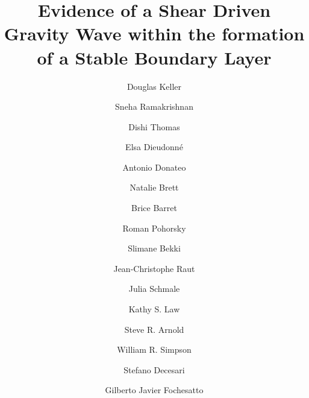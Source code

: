 \documentclass[smallextended]{svjour3}
\begin{document}

\title{Evidence of a Shear Driven Gravity Wave within the formation of a Stable Boundary Layer}


\author{
Douglas Keller \and
Sneha Ramakrishnan \and
Dishi Thomas \and
Elsa Dieudonné \and
Antonio Donateo \and
Natalie Brett \and
Brice Barret \and
Roman Pohorsky \and
Slimane Bekki \and
Jean-Christophe Raut \and
Julia Schmale \and
Kathy S. Law \and
Steve R. Arnold \and
William R. Simpson \and
Stefano Decesari \and
Gilberto Javier Fochesatto
}
\end{document}
